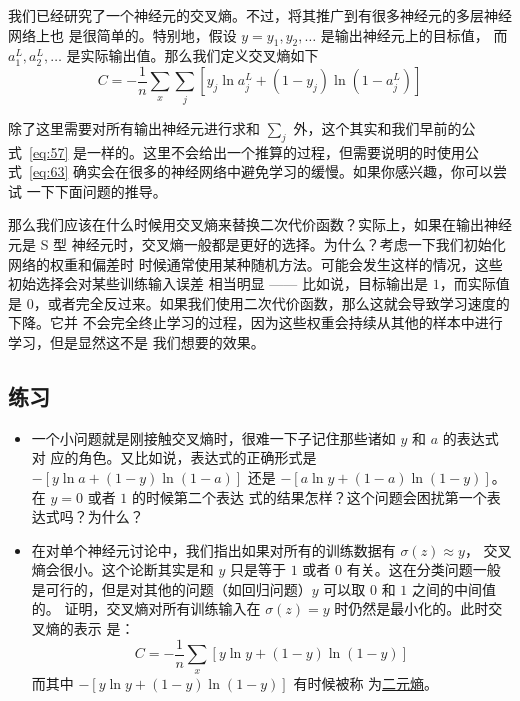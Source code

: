 我们已经研究了一个神经元的交叉熵。不过，将其推广到有很多神经元的多层神经网络上也
是很简单的。特别地，假设 $y = y_1, y_2, \ldots$ 是输出神经元上的目标值，
而 $a^L_1, a^L_2, \ldots$ 是实际输出值。那么我们定义交叉熵如下
\begin{equation}
  C = -\frac{1}{n} \sum_x \sum_j \left[y_j \ln a^L_j + (1-y_j) \ln (1-a^L_j) \right]
  \label{eq:63}\tag{63}
\end{equation}

除了这里需要对所有输出神经元进行求和 $\sum_j$ 外，这个其实和我们早前的公
式~\eqref{eq:57} 是一样的。这里不会给出一个推算的过程，但需要说明的时使用公
式~\eqref{eq:63} 确实会在很多的神经网络中避免学习的缓慢。如果你感兴趣，你可以尝试
一下下面问题的推导。

那么我们应该在什么时候用交叉熵来替换二次代价函数？实际上，如果在输出神经元是 S 型
神经元时，交叉熵一般都是更好的选择。为什么？考虑一下我们初始化网络的权重和偏差时
时候通常使用某种随机方法。可能会发生这样的情况，这些初始选择会对某些训练输入误差
相当明显 —— 比如说，目标输出是 $1$，而实际值是
$0$，或者完全反过来。如果我们使用二次代价函数，那么这就会导致学习速度的下降。它并
不会完全终止学习的过程，因为这些权重会持续从其他的样本中进行学习，但是显然这不是
我们想要的效果。

\subsection*{练习}

\begin{itemize}
\item 一个小问题就是刚接触交叉熵时，很难一下子记住那些诸如 $y$ 和 $a$ 的表达式对
  应的角色。又比如说，表达式的正确形式是 $-[y \ln a + (1-y) \ln
  (1-a)]$ 还是 $-[a \ln y + (1-a) \ln (1-y)]$。在 $y=0$ 或者 $1$ 的时候第二个表达
  式的结果怎样？这个问题会困扰第一个表达式吗？为什么？
\item 在对单个神经元讨论中，我们指出如果对所有的训练数据有 $\sigma(z) \approx y$，
  交叉熵会很小。这个论断其实是和 $y$ 只是等于 $1$ 或者 $0$ 有关。这在分类问题一般
  是可行的，但是对其他的问题（如回归问题）$y$ 可以取 $0$ 和 $1$ 之间的中间值的。
  证明，交叉熵对所有训练输入在 $\sigma(z) = y$ 时仍然是最小化的。此时交叉熵的表示
  是：
  \begin{equation}
    C = -\frac{1}{n} \sum_x [y \ln y+(1-y) \ln(1-y)]
    \label{eq:64}\tag{64}
  \end{equation}
  而其中 $-[y \ln y+(1-y)\ln(1-y)]$ 有时候被称
  为\href{http://en.wikipedia.org/wiki/Binary_entropy_function}{二元熵}。
\end{itemize}

